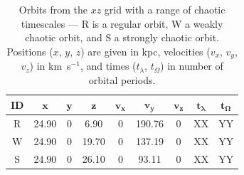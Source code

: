 \documentclass[letterpaper,12pt,preprint]{aastex}
\newcommand{\bs}[1]{\boldsymbol{#1}}
\begin{document}
\begin{table}[ht]
\begin{center}
	\begin{tabular}{c | c c c c c c | c c }
		{\bf ID} & $\bs{x}$ & $\bs{y}$ & $\bs{z}$ & $\bs{v_x}$ & $\bs{v_y}$ & $\bs{v_z}$ & $\bs{t_\lambda}$ & $\bs{t_\Omega}$ \\\toprule
		R & 24.90 & 0 & 6.90 & 0 & 190.76 & 0 & XX & YY\\
		\midrule
		W & 24.90 & 0 & 19.70 & 0 & 137.19 & 0 & XX & YY\\
		\midrule
		S & 24.90 & 0 & 26.10 & 0 & 93.11 & 0 & XX & YY\\
		\bottomrule
		\end{tabular}
	\caption{Orbits from the $xz$ grid with a range of chaotic timescales --- R is a regular orbit, W a weakly chaotic orbit, and S a strongly chaotic orbit. Positions ($x$, $y$, $z$) are given in kpc, velocities ($v_x$, $v_y$, $v_z$) in km~s$^{-1}$, and times ($t_\lambda$, $t_\Omega$) in number of orbital periods. \label{tbl:three-orbits}}
\end{center}
\end{table}
\end{document}
